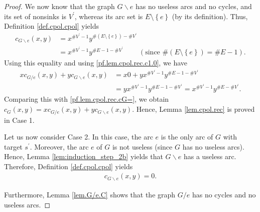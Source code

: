 \documentclass[12pt]{amsart}
\theoremstyle{definition}
\newcommand{\tup}[1]{\left( #1 \right)}
\newcommand{\NS}{V^{\prime}}
\begin{document}
\begin{proof}
We now know that the graph $G\backslash e$ has no useless arcs and no cycles,
and its set of nonsinks is $\NS$, whereas its arc set is
$E\setminus\left\{  e\right\}  $ (by its definition). Thus, Definition
\ref{def.cpol.cpol} yields
\begin{align*}
c_{G\backslash e}\left(  x,y\right)   &  =x^{\#\NS -1}y^{\#\left(
E\setminus\left\{  e\right\}  \right)  -\#\NS}\\
&  =x^{\#\NS -1}y^{\#E-1-\#\NS}\ \ \ \ \ \ \ \ \ \ \left(
\text{since }\#\left(  E\setminus\left\{  e\right\}  \right)  =\#E-1\right)  .
\end{align*}
Using this equality and using \eqref{pf.lem.cpol.rec.c1.0}, we have
\begin{align*}
x c_{G/e}\left(  x,y\right) + y c_{G\backslash e} \tup{x,y}
&  =x0+yx^{\#\NS -1}y^{\#E-1-\#\NS} \\
& =yx^{\#\NS -1}y^{\#E-1-\#\NS}=x^{\#\NS -1}y^{\#E-\#\NS}.
\end{align*}
Comparing this with \eqref{pf.lem.cpol.rec.cG=}, we obtain $c_{G}\left(
x,y\right)  =xc_{G/e}\left(  x,y\right)  +yc_{G\backslash e}\left(
x,y\right)  $. Hence, Lemma \ref{lem.cpol.rec} is proved in Case 1.

Let us now consider Case 2. In this case, the arc $e$ is the only arc of $G$
with target $s^{\prime}$. Moreover, the arc $e$ of $G$ is not useless (since
$G$ has no useless arcs). Hence, Lemma \ref{lem:induction_step_2b} yields
that $G\backslash e$ has a useless arc. Therefore,
Definition \ref{def.cpol.cpol} yields
\begin{align}
c_{G\backslash e}\left(  x,y\right)  = 0 .
\label{pf.lem.cpol.rec.c2.0}
\end{align}


Furthermore, Lemma \ref{lem.G/e.C} shows that the graph $G/e$ has no cycles
and no useless arcs.


\end{proof}
\end{document}
